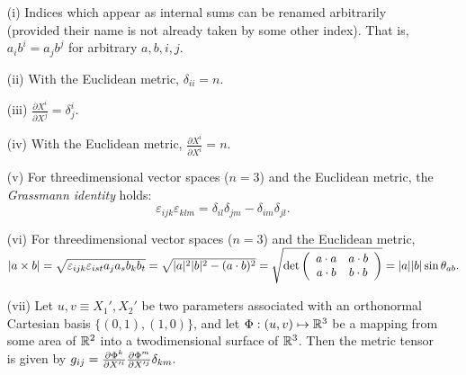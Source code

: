 \begin{itemize}
\item[(i)]
Indices which appear as internal sums can be renamed arbitrarily
(provided their name is not already taken by some other index).
That is, $a_ib^i=a_jb^j$ for arbitrary $a,b,i,j$.
\item[(ii)]
With the Euclidean metric, $\delta_{ii}=n$.
\item[(iii)]
$\frac{\partial X^i }{\partial X^j}=\delta^i_j$.
\item[(iv)]
With the Euclidean metric, $\frac{\partial X^i }{ \partial X^i}=n$.
\item[(v)]
For threedimensional vector spaces ($n=3$)  and the Euclidean metric,
the {\em Grassmann identity} holds:
\begin{equation}
 \varepsilon_{ijk}\varepsilon_{klm}
=  \delta_{il}\delta_{jm}-\delta_{im}\delta_{jl}.
\label{2011-m-egi}
\end{equation}
\item[(vi)]
For threedimensional vector spaces ($n=3$) and the Euclidean metric,\\
$\vert a\times b \vert=
\sqrt{\varepsilon_{ijk}\varepsilon_{ist}a_ja_sb_kb_t}  =
\sqrt{\vert a\vert^2
\vert b\vert^2
-(a\cdot b)^2}=\sqrt{{\rm det}
\left(
\begin{array}{cc}
a\cdot a&a\cdot b\\
a\cdot b&b\cdot b
\end{array}\right)}= \vert a\vert
\vert b\vert \sin \theta_{ab}.$
\item[(vii)]
Let $u,v\equiv X_1',X_2'$ be two parameters associated with an
orthonormal Cartesian basis $\{(0,1),(1,0)\}$, and let
$\Phi :(u,v)\mapsto {\Bbb R}^3$
be a mapping from some area of ${\Bbb R}^2$ into a twodimensional
surface of ${\Bbb R}^3$. Then the metric tensor is given by
$g_{ij}=
{\partial \Phi^k \over \partial X'^i}
{\partial \Phi^m \over \partial X'^j} \delta_{km}.$

\end{itemize}






